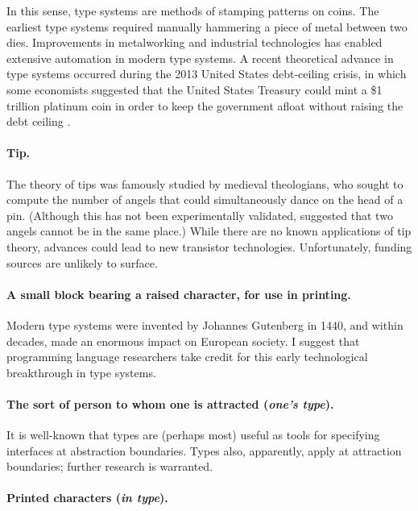 \documentclass[10pt]{article}
\begin{document}
In this sense, type systems are methods of stamping patterns on coins. The
earliest type systems required manually hammering a piece of metal between two
dies. Improvements in metalworking and industrial technologies has enabled
extensive automation in modern type systems. A recent theoretical advance in
type systems occurred during the 2013 United States debt-ceiling crisis, in
which some economists suggested that the United States Treasury could mint a \$1
trillion platinum coin in order to keep the government afloat without raising
the debt ceiling \citep{matthews13}.

\paragraph{Tip.}

The theory of tips was famously studied by medieval theologians, who sought to
compute the number of angels that could simultaneously dance on the head of a
pin. (Although this has not been experimentally validated, \citet{aquinas}
suggested that two angels cannot be in the same place.) While there are no known
applications of tip theory, advances could lead to new transistor technologies.
Unfortunately, funding sources are unlikely to surface.

\paragraph{A small block bearing a raised character, for use in printing.}

Modern type systems were invented by Johannes Gutenberg in 1440, and within
decades, made an enormous impact on European society. I suggest that programming
language researchers take credit for this early technological breakthrough in
type systems.

\paragraph{The sort of person to whom one is attracted (\emph{one's type}).}

It is well-known that types are (perhaps most) useful as tools for specifying
interfaces at abstraction boundaries. Types also, apparently, apply at
attraction boundaries; further research is warranted.

\paragraph{Printed characters (\emph{in type}).}
\end{document}
